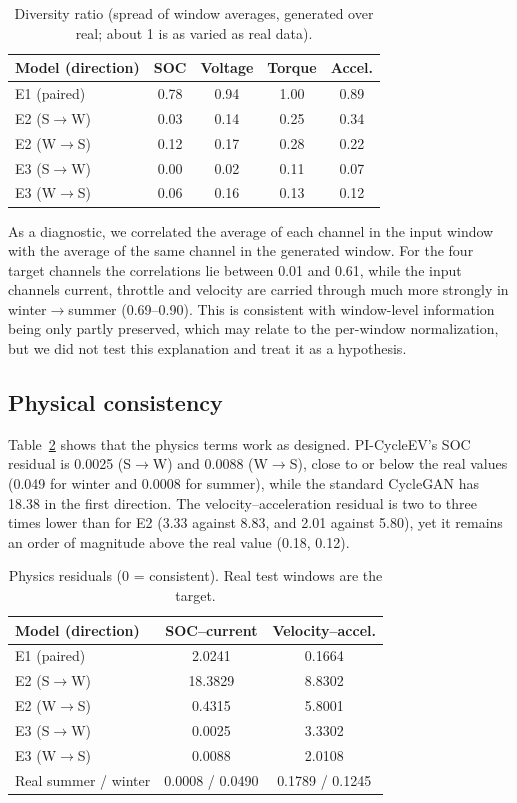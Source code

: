 \documentclass[conference]{IEEEtran}
\begin{document}
\begin{table}[t]
\caption{Diversity ratio (spread of window averages, generated over real; about 1 is as varied as real data).}
\label{tab:div}
\centering\small
\setlength{\tabcolsep}{4pt}
\begin{tabular}{lcccc}
\toprule
Model (direction) & SOC & Voltage & Torque & Accel.\\
\midrule
E1 (paired) & 0.78 & 0.94 & 1.00 & 0.89\\
E2 (S$\rightarrow$W) & 0.03 & 0.14 & 0.25 & 0.34\\
E2 (W$\rightarrow$S) & 0.12 & 0.17 & 0.28 & 0.22\\
E3 (S$\rightarrow$W) & 0.00 & 0.02 & 0.11 & 0.07\\
E3 (W$\rightarrow$S) & 0.06 & 0.16 & 0.13 & 0.12\\
\bottomrule
\end{tabular}
\end{table}

As a diagnostic, we correlated the average of each channel in the input window with the average of the same channel in the generated window. For the four target channels the correlations lie between 0.01 and 0.61, while the input channels current, throttle and velocity are carried through much more strongly in winter$\rightarrow$summer (0.69--0.90). This is consistent with window-level information being only partly preserved, which may relate to the per-window normalization, but we did not test this explanation and treat it as a hypothesis.

\subsection{Physical consistency}
Table~\ref{tab:phys} shows that the physics terms work as designed. PI-CycleEV's SOC residual is 0.0025 (S$\rightarrow$W) and 0.0088 (W$\rightarrow$S), close to or below the real values (0.049 for winter and 0.0008 for summer), while the standard CycleGAN has 18.38 in the first direction. The velocity--acceleration residual is two to three times lower than for E2 (3.33 against 8.83, and 2.01 against 5.80), yet it remains an order of magnitude above the real value (0.18, 0.12).

\begin{table}[t]
\caption{Physics residuals (0 = consistent). Real test windows are the target.}
\label{tab:phys}
\centering\small
\setlength{\tabcolsep}{4pt}
\begin{tabular}{lcc}
\toprule
Model (direction) & SOC--current & Velocity--accel.\\
\midrule
E1 (paired) & 2.0241 & 0.1664\\
E2 (S$\rightarrow$W) & 18.3829 & 8.8302\\
E2 (W$\rightarrow$S) & 0.4315 & 5.8001\\
E3 (S$\rightarrow$W) & 0.0025 & 3.3302\\
E3 (W$\rightarrow$S) & 0.0088 & 2.0108\\
Real summer / winter & 0.0008 / 0.0490 & 0.1789 / 0.1245\\
\bottomrule
\end{tabular}
\end{table}
\end{document}
